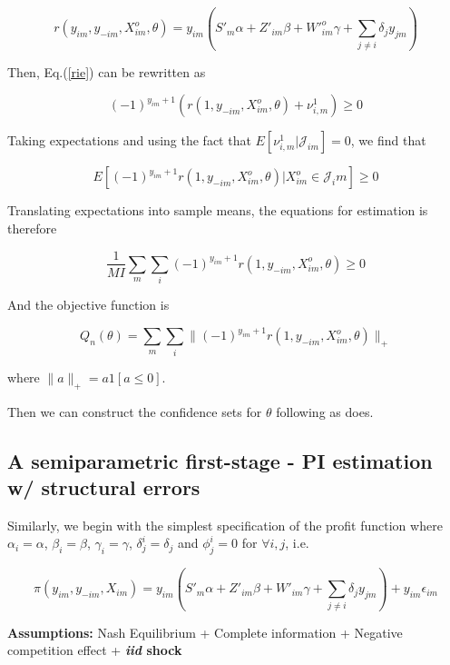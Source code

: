 \documentclass[draft]{article}
\begin{document}
$$r(y_{im},y_{-im},X^o_{im}, \theta) = y_{im}(S'_m\alpha+Z'_{im}\beta + W'^o_{im}\gamma + \sum_{j\neq i}\delta_j y_{jm})$$



Then, Eq.(\ref{rie}) can be rewritten as 

\begin{equation}
 (-1)^{y_{im}+1}(r(1,y_{-im},X^o_{im},\theta)+ \nu^1_{i,m} )\geq 0
\label{rie_PI}
\end{equation}

Taking expectations and using the fact that $E[\nu^1_{i,m}|\mathcal{J}_{im}] = 0$, we find that 


\begin{equation}
 E[(-1)^{y_{im}+1}r(1,y_{-im},X^o_{im},\theta)|X^o_{im} \in \mathcal{J}_im]\geq 0
\label{rie_PI_exp}
\end{equation}

Translating expectations into sample means, the equations for estimation is therefore

\begin{equation}
\dfrac{1}{MI}\sum_m\sum_i(-1)^{y_{im}+1}r(1,y_{-im},X^o_{im},\theta) \geq 0
\end{equation}

And the objective function is 

$$Q_n(\theta) = \sum_m\sum_i\|(-1)^{y_{im}+1}r(1,y_{-im},X^o_{im},\theta) \|_+$$

where $\|a\|_+ = a1[a \leq 0].$

Then we can construct the confidence sets for $\theta$ following \cite{chernozhukov2007estimation} as \cite{ciliberto2009market} does.

\subsection{A semiparametric first-stage - PI estimation w/ structural errors}


Similarly, we begin with the simplest specification of the profit function where $\alpha_i=\alpha$, $\beta_i=\beta$, $\gamma_i=\gamma$, $\delta_j^i=\delta_j$ and $\phi_j^i=0$ for $\forall i,j$, i.e.

\begin{equation}
\pi(y_{im},y_{-im},X_{im})=y_{im}(S'_m\alpha+Z'_{im}\beta+W'_{im}\gamma+\sum_{j\neq i}\delta_{j} y_{jm})+y_{im}\epsilon_{im} 
\end{equation}



\textbf{Assumptions:} Nash Equilibrium + Complete information + Negative competition effect + \textbf{\textit{iid} shock}
\end{document}
